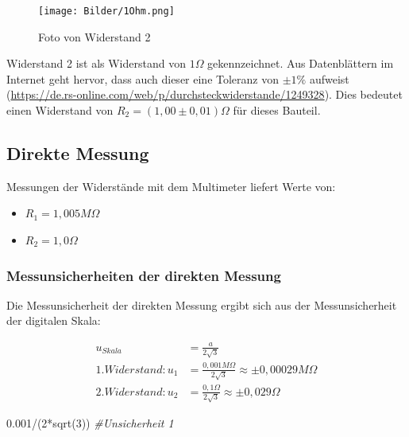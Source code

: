 \documentclass[class=article, crop=false]{standalone}
\newenvironment{Shaded}{\begin{snugshade}}{\end{snugshade}}
\newcommand{\CommentTok}[1]{\textcolor[rgb]{0.56,0.35,0.01}{\textit{#1}}}
\newcommand{\DecValTok}[1]{\textcolor[rgb]{0.00,0.00,0.81}{#1}}
\newcommand{\FloatTok}[1]{\textcolor[rgb]{0.00,0.00,0.81}{#1}}
\newcommand{\FunctionTok}[1]{\textcolor[rgb]{0.00,0.00,0.00}{#1}}
\newcommand{\NormalTok}[1]{#1}
\newcommand{\SpecialCharTok}[1]{\textcolor[rgb]{0.00,0.00,0.00}{#1}}
\begin{document}
\begin{figure}
\centering
\texttt{[image: Bilder/1Ohm.png]}
\caption{Foto von Widerstand 2}
\end{figure}

Widerstand 2 ist als Widerstand von \(1\Omega\) gekennzeichnet. Aus
Datenblättern im Internet geht hervor, dass auch dieser eine Toleranz
von \(\pm 1 \%\) aufweist
(\url{https://de.rs-online.com/web/p/durchsteckwiderstande/1249328}).
Dies bedeutet einen Widerstand von \(R_2=(1,00 \pm 0,01)\Omega\) für
dieses Bauteil.

\hypertarget{direkte-messung}{%
\subsection{Direkte Messung}\label{direkte-messung}}

Messungen der Widerstände mit dem Multimeter liefert Werte von:

\begin{itemize}
\item $R_1 = 1,005 M\Omega$\\
\item $R_2 = 1,0 \Omega$
\end{itemize}

\hypertarget{messunsicherheiten-der-direkten-messung}{%
\subsubsection{Messunsicherheiten der direkten
Messung}\label{messunsicherheiten-der-direkten-messung}}

Die Messunsicherheit der direkten Messung ergibt sich aus der
Messunsicherheit der digitalen Skala:

\begin{equation*}
\begin{split}
u_{Skala} &=\frac{a}{2\sqrt{3}} \\
1.Widerstand: u_1 &= \frac{0,001M\Omega}{2\sqrt{3}} \approx \pm 0,00029 M\Omega \\
2.Widerstand: u_2 &= \frac{0,1\Omega}{2\sqrt{3}} \approx \pm 0,029\Omega 
\end{split}
\end{equation*}

\begin{Shaded}
\begin{Highlighting}[]
\FloatTok{0.001}\SpecialCharTok{/}\NormalTok{(}\DecValTok{2}\SpecialCharTok{*}\FunctionTok{sqrt}\NormalTok{(}\DecValTok{3}\NormalTok{)) }\CommentTok{\#Unsicherheit 1}
\end{Highlighting}
\end{Shaded}
\end{document}
